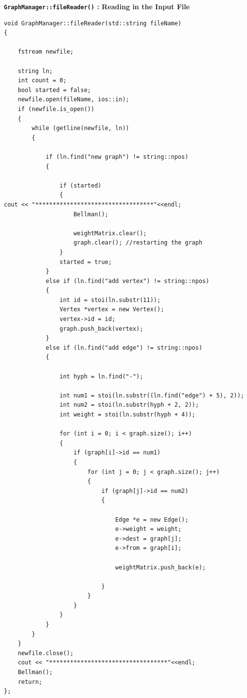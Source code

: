 \documentclass[letterpaper, 10pt]{article}
\begin{document}
\textbf{\texttt{GraphManager::fileReader()}  : Reading in the Input File}
 \begin{addmargin}[-5em]{1em}
\begin{small}
\begin{verbatim}
void GraphManager::fileReader(std::string fileName)
{

	fstream newfile;

	string ln;
	int count = 0;
	bool started = false;
	newfile.open(fileName, ios::in);
	if (newfile.is_open())
	{
		while (getline(newfile, ln)) 
		{

			if (ln.find("new graph") != string::npos)
			{

				if (started)
				{
cout << "**********************************"<<endl;
					Bellman();

					weightMatrix.clear();
					graph.clear(); //restarting the graph
				}
				started = true;
			}
			else if (ln.find("add vertex") != string::npos)
			{
				int id = stoi(ln.substr(11));
				Vertex *vertex = new Vertex();
				vertex->id = id;
				graph.push_back(vertex); 
			}
			else if (ln.find("add edge") != string::npos)
			{

				int hyph = ln.find("-");

				int num1 = stoi(ln.substr((ln.find("edge") + 5), 2)); 
				int num2 = stoi(ln.substr(hyph + 2, 2));
				int weight = stoi(ln.substr(hyph + 4));
				
				for (int i = 0; i < graph.size(); i++) 
				{
					if (graph[i]->id == num1)
					{
						for (int j = 0; j < graph.size(); j++)
						{
							if (graph[j]->id == num2)
							{

								Edge *e = new Edge();
								e->weight = weight;
								e->dest = graph[j];
								e->from = graph[i];
							
								weightMatrix.push_back(e);
							
							}
						}
					}
				}
			}
		}
	}
	newfile.close();
	cout << "**********************************"<<endl;
	Bellman();
	return;
};

\end{verbatim}
\end{small}
\end{addmargin}   
\end{document}
